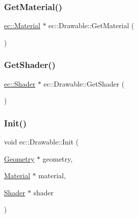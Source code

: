 \mbox{\label{classec_1_1_drawable_ab8126a86667e7c8212c93885ab8e64ff}} 
\subsubsection{\texorpdfstring{Get\+Material()}{GetMaterial()}}
{\footnotesize\ttfamily \mbox{\hyperlink{classec_1_1_material}{ec\+::\+Material}} $\ast$ ec\+::\+Drawable\+::\+Get\+Material (\begin{DoxyParamCaption}{ }\end{DoxyParamCaption})}

\mbox{\label{classec_1_1_drawable_a282c277d2dc8200b4fe2b79e3d5bc3a8}} 
\subsubsection{\texorpdfstring{Get\+Shader()}{GetShader()}}
{\footnotesize\ttfamily \mbox{\hyperlink{classec_1_1_shader}{ec\+::\+Shader}} $\ast$ ec\+::\+Drawable\+::\+Get\+Shader (\begin{DoxyParamCaption}{ }\end{DoxyParamCaption})}

\mbox{\label{classec_1_1_drawable_af3eb193272fc43aedc9aba5104695061}} 
\subsubsection{\texorpdfstring{Init()}{Init()}}
{\footnotesize\ttfamily void ec\+::\+Drawable\+::\+Init (\begin{DoxyParamCaption}\item[{\mbox{\hyperlink{classec_1_1_geometry}{Geometry}} $\ast$}]{geometry,  }\item[{\mbox{\hyperlink{classec_1_1_material}{Material}} $\ast$}]{material,  }\item[{\mbox{\hyperlink{classec_1_1_shader}{Shader}} $\ast$}]{shader }\end{DoxyParamCaption})}

